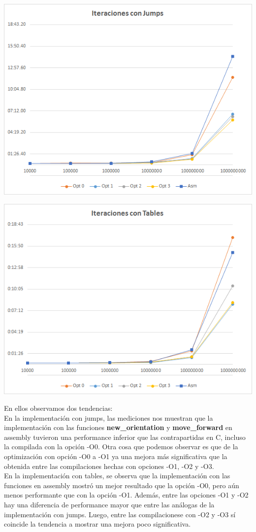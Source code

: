 \documentclass[a4paper, 10pt, twoside, notitlepage]{article}
\begin{document}
\includegraphics[scale=0.9]{chart1.png} 

\includegraphics[scale=0.9]{chart2.png} 

\newpage
En ellos observamos dos tendencias:\\
En la implementación con jumps, las mediciones nos muestran que la implementación con las funciones \textbf{new\_orientation} y \textbf{move\_forward} en assembly tuvieron una performance inferior que las contrapartidas en C, incluso la compilada con la opción -O0.
Otra cosa que podemos observar es que de la optimización con opción -O0 a -O1 ya una mejora más significativa que la obtenida entre las compilaciones hechas con opciones -O1, -O2 y -O3.\\
En la implementación con tables, se observa que la implementación con las funciones en assembly mostró un mejor resultado que la opción -O0, pero aún menos performante que con la opción -O1. Además, entre las opciones -O1 y -O2 hay una diferencia de performance mayor que entre las análogas de la implementación con jumps. Luego, entre las compilacionese con -O2 y -O3 sí coincide la tendencia a mostrar una mejora poco significativa.
\end{document}
